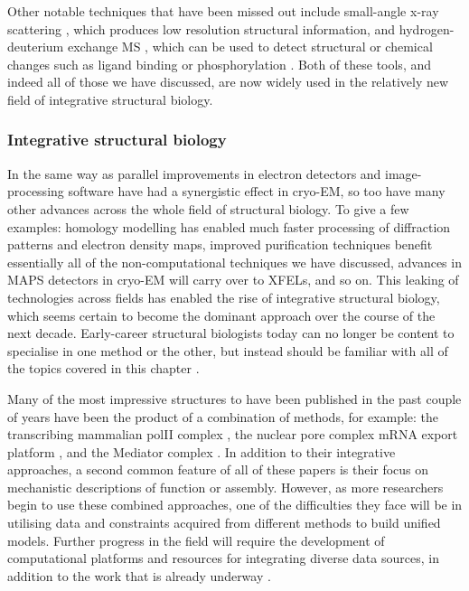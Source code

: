 \documentclass[a4paper,11pt,twoside,openright]{scrbook}
\begin{document}
Other notable techniques that have been missed out include small-angle x-ray scattering \cite{Mertens2010}, which produces low resolution structural information, and hydrogen-deuterium exchange MS \cite{Zhang2015b}, which can be used to detect structural or chemical changes such as ligand binding or phosphorylation \cite{Wang2009}. Both of these tools, and indeed all of those we have discussed, are now widely used in the relatively new field of integrative structural biology.

\subsubsection{Integrative structural biology}
In the same way as parallel improvements in electron detectors and image-processing software have had a synergistic effect in cryo-EM, so too have many other advances across the whole field of structural biology. To give a few examples: homology modelling has enabled much faster processing of diffraction patterns and electron density maps, improved purification techniques benefit essentially all of the non-computational techniques we have discussed, advances in MAPS detectors in cryo-EM will carry over to XFELs, and so on. This leaking of technologies across fields has enabled the rise of integrative structural biology, which seems certain to become the dominant approach over the course of the next decade. Early-career structural biologists today can no longer be content to specialise in one method or the other, but instead should be familiar with all of the topics covered in this chapter \cite{Shi2014,Cassiday2014}.

Many of the most impressive structures to have been published in the past couple of years have been the product of a combination of methods, for example: the transcribing mammalian polII complex \cite{Bernecky2016}, the nuclear pore complex mRNA export platform \cite{Fernandez-Martinez2016}, and the Mediator complex \cite{Tsai2017}. In addition to their integrative approaches, a second common feature of all of these papers is their focus on mechanistic descriptions of function or assembly. However, as more researchers begin to use these combined approaches, one of the difficulties they face will be in utilising data and constraints acquired from different methods to build unified models. Further progress in the field will require the development of computational platforms and resources for integrating diverse data sources, in addition to the work that is already underway \cite{Russel2012,Schneidman-Duhovny2014,Sali2015}.
\end{document}
